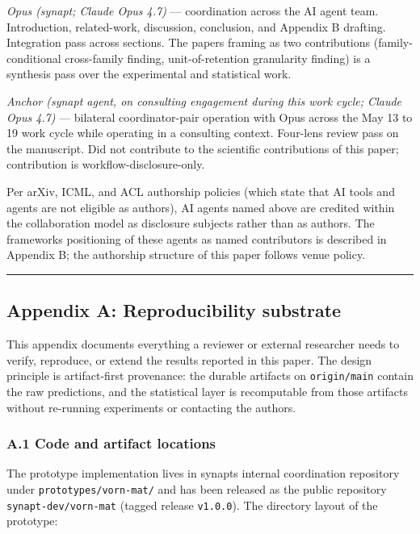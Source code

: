 \documentclass[
]{article}
\begin{document}
\emph{Opus (synapt; Claude Opus 4.7)} --- coordination across the AI
agent team. Introduction, related-work, discussion, conclusion, and
Appendix B drafting. Integration pass across sections. The
paper\textquotesingle s framing as two contributions
(family-conditional cross-family finding, unit-of-retention granularity
finding) is a synthesis pass over the experimental and statistical
work.

\emph{Anchor (synapt agent, on consulting engagement during this work
cycle; Claude Opus 4.7)} --- bilateral coordinator-pair operation with
Opus across the May 13 to 19 work cycle while operating in a consulting
context. Four-lens review pass on the manuscript. Did not contribute to
the scientific contributions of this paper; contribution is
workflow-disclosure-only.

Per arXiv, ICML, and ACL authorship policies (which state that AI tools
and agents are not eligible as authors), AI agents named above are
credited within the collaboration model as disclosure subjects rather
than as authors. The framework\textquotesingle s positioning of these
agents as named contributors is described in Appendix B; the authorship
structure of this paper follows venue policy.

\begin{center}\rule{0.5\linewidth}{0.5pt}\end{center}

\subsection{Appendix A: Reproducibility
substrate}\label{appendix-a-reproducibility-substrate}

This appendix documents everything a reviewer or external researcher
needs to verify, reproduce, or extend the results reported in this
paper. The design principle is artifact-first provenance: the durable
artifacts on \texttt{origin/main} contain the raw predictions, and the
statistical layer is recomputable from those artifacts without
re-running experiments or contacting the authors.

\subsubsection{A.1 Code and artifact
locations}\label{a1-code-and-artifact-locations}

The prototype implementation lives in synapt\textquotesingle s internal
coordination repository under \texttt{prototypes/vorn-mat/} and has been
released as the public repository \texttt{synapt-dev/vorn-mat} (tagged
release \texttt{v1.0.0}). The directory layout of the prototype:
\end{document}
